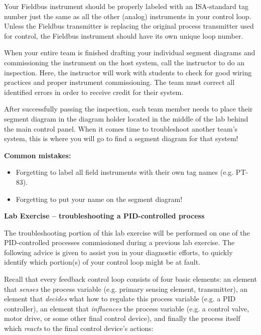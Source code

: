 Your Fieldbus instrument should be properly labeled with an ISA-standard tag number just the same as all the other (analog) instruments in your control loop.  Unless the Fieldbus transmitter is replacing the original process transmitter used for control, the Fieldbus instrument should have its own unique loop number.

When your entire team is finished drafting your individual segment diagrams and commissioning the instrument on the host system, call the instructor to do an inspection.  Here, the instructor will work with students to check for good wiring practices and proper instrument commissioning.  The team must correct all identified errors in order to receive credit for their system.  

After successfully passing the inspection, each team member needs to place their segment diagram in the diagram holder located in the middle of the lab behind the main control panel.  When it comes time to troubleshoot another team's system, this is where you will go to find a segment diagram for that system!

\vskip 10pt

{\bf Common mistakes:}

\begin{itemize}
\item{} Forgetting to label all field instruments with their own tag names (e.g. PT-83).
\item{} Forgetting to put your name on the segment diagram!
\end{itemize}













\vfil \eject

\noindent
{\bf Lab Exercise -- troubleshooting a PID-controlled process}

\vskip 10pt

The troubleshooting portion of this lab exercise will be performed on one of the PID-controlled processes commissioned during a previous lab exercise.  The following advice is given to assist you in your diagnostic efforts, to quickly identify which portion(s) of your control loop might be at fault.

\vskip 10pt

Recall that every feedback control loop consists of four basic elements: an element that {\it senses} the process variable (e.g. primary sensing element, transmitter), an element that {\it decides} what how to regulate this process variable (e.g. a PID controller), an element that {\it influences} the process variable (e.g. a control valve, motor drive, or some other final control device), and finally the process itself which {\it reacts} to the final control device's actions:

